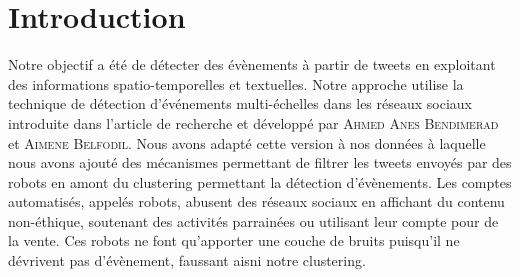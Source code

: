 \documentclass[12pt]{article}
\begin{document}
\begin{abstract}
La d\'etection d'\'ev\`enements est un des sujets de recherche les plus importants dans l'analyse des r\'eseaux sociaux.
Les flux de donn\'ees provenant des plates-formes de ces r\'eseaux contiennent, la plupart du temps, beaucoup d'informations. On peut traiter et analyser ces informations dans le but de faire de la d\'etection d'\'ev\`enement(s). 
\newline
N\'eanmoins, une grande partie des donn\'ees \`a traiter est bruit\'ee, notamment par des comptes Twitter entretenus par des robots. Ces comptes postent des tweets en masse avec une fr\'equence de publication constante, ce qui nous emp\^echent de donner une bonne description d\' un \'ev\'enement ou alors on peut cr\'eer de faux \'ev\`enements. 
\newline
Voila pourquoi il est important de comprendre comment att\'enuer l'influence du bruit pour faire de la d\'etection \'ev\`enements. Notre objectif a \'et\'e de d\'etecter des \'ev\`enements \`a partir de tweets en exploitant des informations spatio-temporelles et textuelles en essayant d'\'ecarter les tweets de robots. 
\end{abstract}

\small{
\tableofcontents 
}

\newpage

\section{Introduction}

Notre objectif a \'et\'e de d\'etecter des \'ev\`enements \`a partir de tweets en exploitant des informations spatio-temporelles et textuelles. Notre approche utilise la technique de d\'etection d'\'ev\'enements multi-\'echelles dans les r\'eseaux sociaux introduite dans l'article de recherche \cite{Multievents} et d\'evelopp\'e par \textsc{Ahmed Anes Bendimerad} et \textsc{Aimene Belfodil}. Nous avons adapt\'e cette version \`a nos donn\'ees \`a laquelle nous avons ajout\'e des m\'ecanismes permettant de filtrer les tweets envoy\'es par des robots en amont du clustering permettant la d\'etection d'\'ev\`enements. Les comptes automatisés, appel\'es robots, abusent des r\'eseaux sociaux en affichant du contenu non-\'ethique, soutenant des activit\'es parrain\'ees ou utilisant leur compte pour de la vente. Ces robots ne font qu'apporter une couche de bruits puisqu'il ne d\'evrivent pas d'\'ev\`enement, faussant aisni notre clustering.
\end{document}
